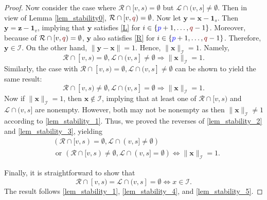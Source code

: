 \documentclass[10 pt,twocolumn,journal]{IEEEtran}
\theoremstyle{plain}
\newcommand{\I}{\mathcal{I}}
\newcommand{\R}{\mathcal{R}}
\renewcommand{\L}{\mathcal{L}}
\newcommand{\x}{\bm{x}}
\newcommand{\y}{\bm{y}}
\newcommand{\z}{\bm{z}}
\newcommand{\p}{\tb{p}}
\newcommand{\q}{\tr{q}}
\newcommand{\tb}{\textcolor{blue}}
\newcommand{\tr}{\textcolor{Myred}}
\theoremstyle{definition}
\begin{document}
\begin{proof}
    Now consider the case where $\R\cap[v,s) = \emptyset$ but $\L\cap(v,s] \neq \emptyset$.
    Then in view of Lemma \ref{lem_stability0}, $\R\cap[v,\q)=\emptyset$.
    Now let $\y=\x-\bm{1}_s$.
    Then $\y = \z -\bm{1}_v$, implying that $\y$ satisfies \eqref{L} for $i\in\{\p+1,\ldots,\q-1\}$.
    Moreover, because of $\R\cap[v,\q)=\emptyset$, $\y$ also satisfies \eqref{R} for $i\in\{\p+1,\ldots,\q-1\}$. 
    Therefore, $\y\in\I$.
    On the other hand, $\|\y-\x\| = 1$.
    Hence, $\|\x\|_{\I}  = 1$.
    Namely,
    \begin{equation}    \label{lem_stability_2}
        \R\cap[v,s) = \emptyset, \L\cap(v,s] \neq \emptyset
        \Rightarrow
        \|\x\|_{\I}  = 1.
    \end{equation}
    Similarly, the case with $\R\cap[v,s) = \emptyset, \L\cap(v,s] \neq \emptyset$ can be shown to yield the same result:
    \begin{equation}    \label{lem_stability_3}
        \R\cap[v,s) \neq \emptyset, \L\cap(v,s] = \emptyset
        \Rightarrow
        \|\x\|_{\I}  = 1.
    \end{equation}
    Now if $\|\x\|_{\I}  = 1$, then $\x\not\in\I$, implying that at least one of $\R\cap[v,s)$ and $\L\cap(v,s]$ are nonempty. 
    However, both may not be nonempty as then $\|\x\|_{\I} \neq1$ according to \eqref{lem_stability_1}. 
    Thus, we proved the reverses of \eqref{lem_stability_2} and \eqref{lem_stability_3}, yielding
    \begin{align}   
        &(\R\cap[v,s) = \emptyset, \L\cap(v,s] \neq \emptyset) \nonumber\\
        &\text{ or }
        (\R\cap[v,s) \neq \emptyset, \L\cap(v,s] = \emptyset)
        \iff
        \|\x\|_{\I}  = 1.  \label{lem_stability_4}
    \end{align}
    
    Finally, it is straightforward to show that 
    \begin{equation}    \label{lem_stability_5}
        \R\cap[v,s) = \L\cap(v,s] = \emptyset
        \iff
        x\in\I.
    \end{equation}
    The result follows \eqref{lem_stability_1}, \eqref{lem_stability_4}, and \eqref{lem_stability_5}.
\end{proof}
\end{document}
